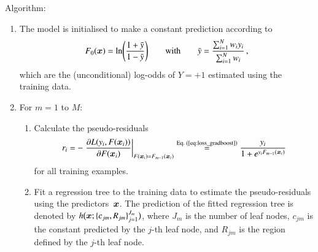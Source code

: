 \vspace{6pt}
\noindent Algorithm:
\begin{enumerate}[itemsep=2pt]

\item The model is initialised to make a constant prediction according to
  \begin{align*}
    F_0(\bm{x}) = \ln\mathopen{}\left( \frac{1 + \bar{y}}{1 - \bar{y}}
    \right)\mathclose{}
    \qquad \text{with} \qquad
    \bar{y} = \frac{\sum_{i=1}^{N} w_i y_i}{\sum_{i=1}^{N} w_i} \,\text{,}
  \end{align*}
  which are the (unconditional) log-odds of $Y = +1$ estimated using the
  training data.

\item For $m = 1$ to $M$:
  \begin{enumerate}[itemsep=2pt]

  \item Calculate the pseudo-residuals
    \begin{align*}
      r_i
      = - \left. \frac{\partial L(y_i, F(\bm{x}_i))}
      {\partial F(\bm{x}_i)}\right|_{F(\bm{x}_i) = F_{m - 1}(\bm{x}_i)}
      \overset{\text{Eq.\ (\ref{eq:loss_gradboost})}}{=}
      \frac{y_i}{1 + e^{y_i F_{m-1}(\bm{x}_i)}}
    \end{align*}
    for all training examples.

  \item Fit a regression tree to the training data to estimate the
    pseudo-residuals using the predictors~$\bm{x}$. The prediction of the
    fitted regression tree is denoted by
    $h\bigl( \bm{x}; \{c_{jm}, R_{jm}\}_{j=1}^{J_{m}} \bigr)$, where $J_{m}$
    is the number of leaf nodes, $c_{jm}$ is the constant predicted by the
    $j$-th leaf node, and $R_{jm}$ is the region defined by the $j$-th leaf
    node.


\end{enumerate}
\end{enumerate}
